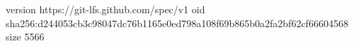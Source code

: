version https://git-lfs.github.com/spec/v1
oid sha256:d244053cb3c98047dc76b1165e0ed798a108f69b865b0a2fa2bf62cf66604568
size 5566
